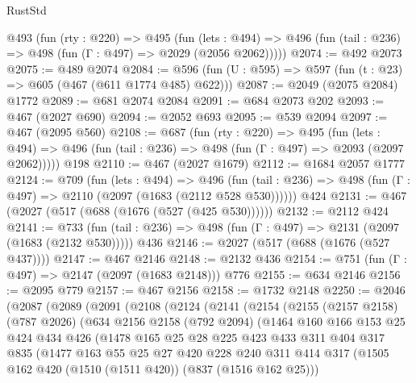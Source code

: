 \begin{lexlean}{RustStd}
\begin{coremodule}
  @493
    (fun (rty : @220) =>
    @495
      (fun (lets : @494) =>
      @496 (fun (tail : @236) => @498 (fun (Γ : @497) => @2029 (@2056 @2062)))))
@2074 := @492 @2073
@2075 := @489 @2074
@2084 := @596 (fun (U : @595) => @597 (fun (t : @23) => @605 (@467 (@611 @1774 @485) @622)))
@2087 := @2049 (@2075 @2084) @1772
@2089 := @681 @2074 @2084
@2091 := @684 @2073 @202
@2093 := @467 (@2027 @690)
@2094 := @2052 @693
@2095 := @539 @2094
@2097 := @467 (@2095 @560)
@2108 := @687
    (fun (rty : @220) =>
    @495
      (fun (lets : @494) =>
      @496 (fun (tail : @236) => @498 (fun (Γ : @497) => @2093 (@2097 @2062)))))
    @198
@2110 := @467 (@2027 @1679)
@2112 := @1684 @2057 @1777
@2124 := @709
    (fun (lets : @494) =>
    @496 (fun (tail : @236) => @498 (fun (Γ : @497) => @2110 (@2097 (@1683 (@2112 @528 @530))))))
    @424
@2131 := @467 (@2027 (@517 (@688 (@1676 (@527 (@425 @530))))))
@2132 := @2112 @424
@2141 := @733
    (fun (tail : @236) => @498 (fun (Γ : @497) => @2131 (@2097 (@1683 (@2132 @530)))))
    @436
@2146 := @2027 (@517 (@688 (@1676 (@527 @437))))
@2147 := @467 @2146
@2148 := @2132 @436
@2154 := @751 (fun (Γ : @497) => @2147 (@2097 (@1683 @2148))) @776
@2155 := @634 @2146
@2156 := @2095 @779
@2157 := @467 @2156
@2158 := @1732 @2148
@2250 := @2046
    (@2087
      (@2089
        (@2091
          (@2108
            (@2124
              (@2141
                (@2154
                  (@2155
                    (@2157 @2158)
                    (@787 @2026)
                    (@634
                      @2156
                      @2158
                      (@792 @2094)
                      (@1464
                        @160
                        @166
                        @153
                        @25
                        @424
                        @434
                        @426
                        (@1478
                          @165
                          @25
                          @28
                          @225
                          @423
                          @433
                          @311
                          @404
                          @317
                          @835
                          (@1477
                            @163
                            @55
                            @25
                            @27
                            @420
                            @228
                            @240
                            @311
                            @414
                            @317
                            (@1505 @162 @420 (@1510 (@1511 @420)) (@837 (@1516 @162 @25)))

\end{coremodule}
\end{lexlean}
